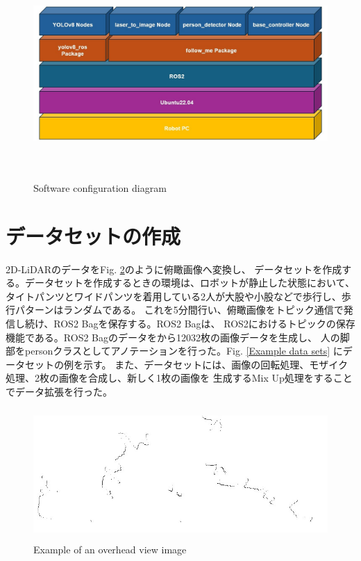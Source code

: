 \begin{figure}[h]
    \begin{center}
    \includegraphics[height=80mm,clip]{figure/Software.jpg}
    \caption{Software configuration diagram}
    \label{Software configuration diagram}
    \end{center}
\end{figure}

\clearpage

\section{データセットの作成}
2D-LiDARのデータをFig. \ref{Example of an overhead view image}のように俯瞰画像へ変換し、
データセットを作成する。データセットを作成するときの環境は、ロボットが静止した状態において、
タイトパンツとワイドパンツを着用している2人が大股や小股などで歩行し、歩行パターンはランダムである。
これを5分間行い、俯瞰画像をトピック通信で発信し続け、ROS2 Bagを保存する。ROS2 Bagは、
ROS2におけるトピックの保存機能である。ROS2 Bagのデータをから12032枚の画像データを生成し、
人の脚部をpersonクラスとしてアノテーションを行った。Fig. \ref{Example data sets}
にデータセットの例を示す。
また、データセットには、画像の回転処理、モザイク処理、2枚の画像を合成し、新しく1枚の画像を
生成するMix Up処理をすることでデータ拡張を行った。

\begin{figure}[h]
    \begin{center}
    \includegraphics[height=50mm,clip]{figure/laser_img_232.jpg}
    \caption{Example of an overhead view image}
    \label{Example of an overhead view image}
    \end{center}
\end{figure}

